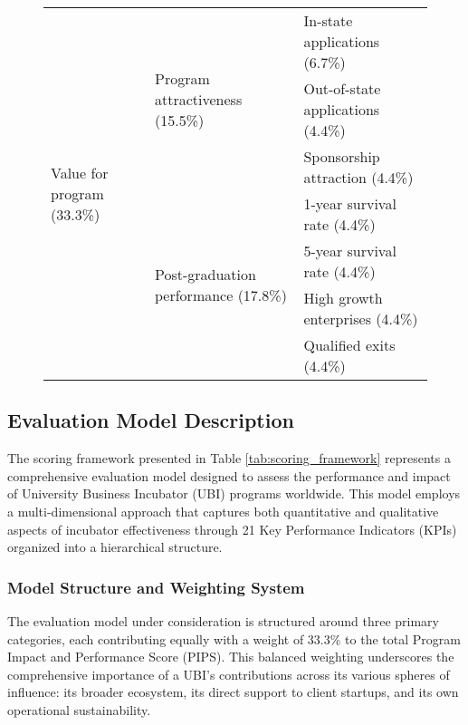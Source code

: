 \documentclass[../Main.tex]{subfiles}
\begin{document}
\begin{figure}[H]
\begin{tabular}{|p{}|p{}|p{}|}
\hline
\multirow{7}{=}{Value for program (33.3\%)} & \multirow{3}{=}{Program attractiveness (15.5\%)} & In-state applications (6.7\%) \\
\cline{3-3}
& & Out-of-state applications (4.4\%) \\
\cline{3-3}
& & Sponsorship attraction (4.4\%) \\
\cline{2-3}
& \multirow{4}{=}{Post-graduation performance (17.8\%)} & 1-year survival rate (4.4\%) \\
\cline{3-3}
& & 5-year survival rate (4.4\%) \\
\cline{3-3}
& & High growth enterprises (4.4\%) \\
\cline{3-3}
& & Qualified exits (4.4\%) \\
\hline
\end{tabular}
\end{figure}

\subsection{Evaluation Model Description}

The scoring framework presented in Table \ref{tab:scoring_framework} represents a comprehensive evaluation model designed to assess the performance and impact of University Business Incubator (UBI) programs worldwide. This model employs a multi-dimensional approach that captures both quantitative and qualitative aspects of incubator effectiveness through 21 Key Performance Indicators (KPIs) organized into a hierarchical structure.

\subsubsection{Model Structure and Weighting System}

The evaluation model under consideration is structured around three primary categories, each contributing equally with a weight of 33.3\% to the total Program Impact and Performance Score (PIPS). This balanced weighting underscores the comprehensive importance of a UBI's contributions across its various spheres of influence: its broader ecosystem, its direct support to client startups, and its own operational sustainability.
\end{document}
